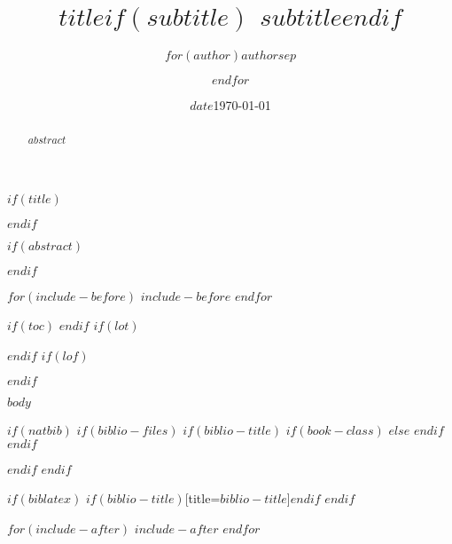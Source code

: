 \documentclass[$if(fontsize)$$fontsize$,$endif$$if(lang)$$lang$,$endif$$if(papersize)$$papersize$,$endif$$for(classoption)$$classoption$$sep$,$endfor$]{article}%
\title{\huge $title$$if(subtitle)$ {\large $subtitle$}$endif$}
\author{$for(author)$$author$$sep$ \and $endfor$}
\date{$date$}
\date{\today}
\begin{document}
$if(title)$
\maketitle
$endif$

\tableofcontents
\thispagestyle{empty}

$if(abstract)$
\begin{abstract}
$abstract$
\end{abstract}
$endif$

$for(include-before)$
$include-before$
$endfor$

$if(toc)$
{
\hypersetup{colorlinks=true,linktoc=all,linkcolor=black}
\setcounter{tocdepth}{$toc-depth$}
\tableofcontents
}
$endif$
$if(lot)$
\listoftables
$endif$
$if(lof)$
\listoffigures
$endif$

$body$

$if(natbib)$
$if(biblio-files)$
$if(biblio-title)$
$if(book-class)$
\renewcommand\bibname{$biblio-title$}
$else$
\renewcommand\refname{$biblio-title$}
$endif$
$endif$

$endif$
$endif$

$if(biblatex)$
\printbibliography$if(biblio-title)$[title=$biblio-title$]$endif$
$endif$

$for(include-after)$
$include-after$
$endfor$
\end{document}
